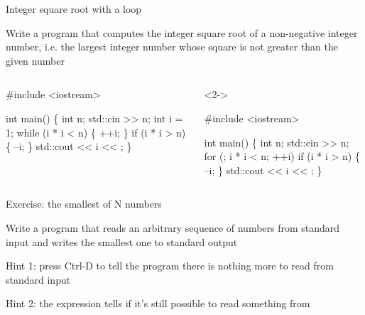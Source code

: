 \begin{frame}[fragile]{Integer square root with a  loop}

  Write a program that computes the integer square root of a non-negative
  integer number, i.e. the largest integer number whose square is not greater
  than the given number

  \begin{columns}[T]
    \begin{column}{.35\textwidth}
      \begin{codeblock}
#include <iostream>

int main()
\{
  int n;
  std::cin >{}> n;
  int i = 1;
  while (i * i < n) \{
    ++i;
  \}
  if (i * i > n) \{
    --i;
  \}
  std::cout <{}< i <{}< \bslashn;
\}\end{codeblock}
    \end{column}

    \begin{column}{.65\textwidth}
      \begin{codeblock}<2->{
#include <iostream>

int main()
\{
  int n;
  std::cin >{}> n;
  for (; i * i < n; ++i) 
  if (\alert<3>{i} * \alert<3>{i} > n) \{
    --\alert<3>{i};
  \}
  std::cout <{}< i <{}< \bslashn;
\}}\end{codeblock}
    \end{column}

  \end{columns}


\end{frame}

\begin{frame}{Exercise: the smallest of N numbers}

  Write a program that reads an arbitrary sequence of numbers from standard
  input and writes the smallest one to standard output

  Hint 1: press Ctrl-D to tell the program there is nothing more to read from
  standard input

  Hint 2: the expression  tells if it's still possible to
  read something from 
\end{frame}
